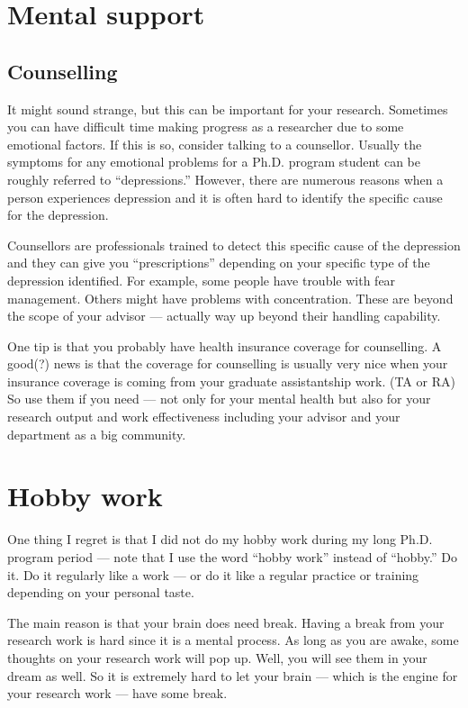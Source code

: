 \documentclass[11pt]{article}
\begin{document}
\section{Mental support}

\subsection{Counselling}
It might sound strange, but this can be important for your research.
Sometimes you can have difficult time making progress as a researcher
due to some emotional factors. If this is so, consider talking to a
counsellor.  Usually the symptoms for any emotional problems for a Ph.D.
program student can be roughly referred to ``depressions.'' However,
there are numerous reasons when a person experiences depression and it
is often hard to identify the specific cause for the depression.

Counsellors are professionals trained to detect this specific cause of
the depression and they can give you ``prescriptions'' depending on your
specific type of the depression identified. For example, some people
have trouble with fear management. Others might have problems with
concentration. These are beyond the scope of your advisor --- actually
way up beyond their handling capability.

One tip is that you probably have health insurance coverage for
counselling. A good(?) news is that the coverage for counselling is
usually very nice when your insurance coverage is coming from your
graduate assistantship work. (TA or RA) So use them if you need --- not
only for your mental health but also for your research output and work
effectiveness including your advisor and your department as a big community.

\section{Hobby work}

One thing I regret is that I did not do my hobby work during my long
Ph.D. program period --- note that I use the word ``hobby work'' instead
of ``hobby.'' Do it. Do it regularly like a work --- or do it like a
regular practice or training depending on your personal taste.

The main reason is that your brain does need break. Having a break from
your research work is hard since it is a mental process. As long as you
are awake, some thoughts on your research work will pop up. Well, you
will see them in your dream as well. So it is extremely hard to let your
brain --- which is the engine for your research work --- have some
break.
\end{document}
